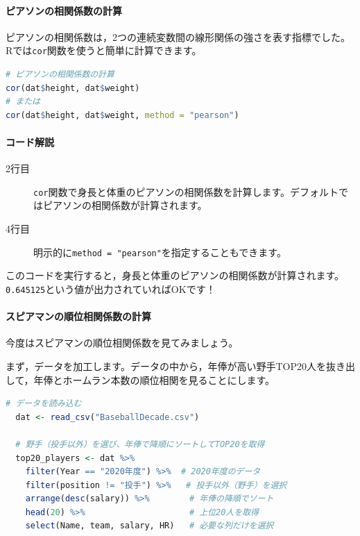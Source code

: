 \documentclass{ltjsbook}
\begin{document}
\paragraph{ピアソンの相関係数の計算}
ピアソンの相関係数は，2つの連続変数間の線形関係の強さを表す指標でした。Rでは\verb|cor|関数を使うと簡単に計算できます。

\begin{lstlisting}[language=R,label={code:06_04},caption={ピアソンの相関係数の計算}]
# ピアソンの相関係数の計算
cor(dat$height, dat$weight)
# または
cor(dat$height, dat$weight, method = "pearson")
\end{lstlisting}

\paragraph{コード解説}
\begin{description}
    \item[2行目] \verb|cor|関数で身長と体重のピアソンの相関係数を計算します。デフォルトではピアソンの相関係数が計算されます。
    \item[4行目] 明示的に\verb|method = "pearson"|を指定することもできます。
\end{description}

このコードを実行すると，身長と体重のピアソンの相関係数が計算されます。\verb|0.645125|という値が出力されていればOKです！

\paragraph{スピアマンの順位相関係数の計算}
今度はスピアマンの順位相関係数を見てみましょう。

まず，データを加工します。データの中から，年俸が高い野手TOP20人を抜き出して，年俸とホームラン本数の順位相関を見ることにします。
\begin{lstlisting}[language=R,label={code:06_05},caption={年俸が高い野手TOP20の抽出}]
  # データを読み込む
  dat <- read_csv("BaseballDecade.csv")
  
  # 野手（投手以外）を選び、年俸で降順にソートしてTOP20を取得
  top20_players <- dat %>%
    filter(Year == "2020年度") %>%  # 2020年度のデータ
    filter(position != "投手") %>%   # 投手以外（野手）を選択
    arrange(desc(salary)) %>%        # 年俸の降順でソート
    head(20) %>%                     # 上位20人を取得
    select(Name, team, salary, HR)   # 必要な列だけを選択
  \end{lstlisting}
  
\end{document}

